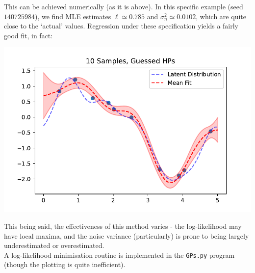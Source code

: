 \documentclass[12pt]{article}
\begin{document}
    This can be achieved numerically (as it is above). In this specific example (seed $140725984$), we find MLE estimates $\ell \simeq 0.785$ and $\sigma_n^2 \simeq 0.0102$, which are quite close to the `actual' values. Regression under these specification yields a fairly good fit, in fact:
    \begin{center}
        \includegraphics{hp_fitted.pdf}
    \end{center}
    This being said, the effectiveness of this method varies - the log-likelihood may have local maxima, and the noise variance (particularly) is prone to being largely underestimated or overestimated.\\
    A log-likelihood minimisation routine is implemented in the \verb|GPs.py| program (though the plotting is quite inefficient).
\end{document}
